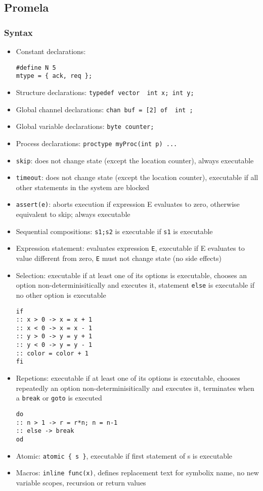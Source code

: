 \documentclass{article}
\begin{document}
\subsection{Promela}
\subsubsection{Syntax}
\begin{itemize}
    \item Constant declarations:
          \begin{verbatim}
#define N 5
mtype = { ack, req };
    \end{verbatim}
    \item Structure declarations: \texttt{typedef vector { int x; int y};}
    \item Global channel declarations: \texttt{chan buf = [2] of { int };}
    \item Global variable declarations: \texttt{byte counter;}
    \item Process declarations: \texttt{proctype myProc(int p) {...}}
    \item \texttt{skip}: does not change state (except the location counter), always executable
    \item \texttt{timeout}: does not change state (except the location counter), executable if all other statements in the system are blocked
    \item \texttt{assert(e)}: aborts execution if expression E evaluates to zero, otherwise equivalent to skip; always executable
    \item Sequential compositions: \texttt{s1;s2} is executable if \texttt{s1} is executable
    \item Expression statement: evaluates expression \texttt{E}, executable if E evaluates to value different from zero,
          \texttt{E} must not change state (no side effects)
    \item Selection: executable if at least one of its options is executable, chooses an option non-determinisitically and executes it,
          statement \texttt{else} is executable if no other option is executable
          \begin{verbatim}
if
:: x > 0 -> x = x + 1
:: x < 0 -> x = x - 1
:: y > 0 -> y = y + 1
:: y < 0 -> y = y - 1
:: color = color + 1
fi
\end{verbatim}
    \item Repetions: executable if at least one of its options is executable, chooses repeatedly an option non-determinisitically and executes it,
          terminates when a \texttt{break} or \texttt{goto} is executed
          \begin{verbatim}
do
:: n > 1 -> r = r*n; n = n-1
:: else -> break
od
\end{verbatim}
    \item Atomic: \texttt{atomic \{ s \}}, executable if first statement of s is executable
    \item Macros: \texttt{inline func(x){}}, defines replacement text for symbolix name, no new variable scopes, recursion or return values
\end{itemize}
\end{document}
